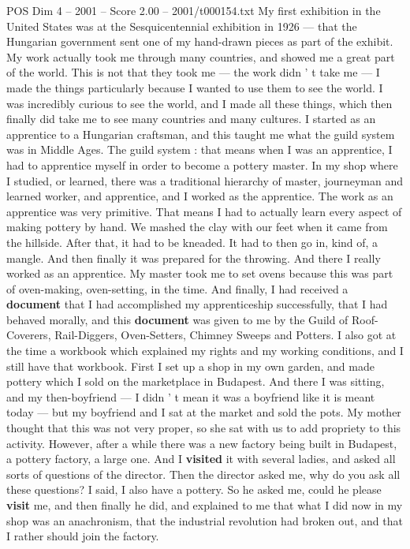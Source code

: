 \begin{textsample}{POS Dim 4 – 2001 – Score 2.00 – 2001/t000154.txt}
My first exhibition in the United States was at the Sesquicentennial exhibition in 1926 — that the Hungarian government sent one of my hand-drawn pieces as part of the exhibit.
My work actually took me through many countries, and showed me a great part of the world.
This is not that they took me — the work didn ' t take me — I made the things particularly because I wanted to use them to see the world.
I was incredibly curious to see the world, and I made all these things, which then finally did take me to see many countries and many cultures.
I started as an apprentice to a Hungarian craftsman, and this taught me what the guild system was in Middle Ages.
The guild system : that means when I was an apprentice, I had to apprentice myself in order to become a pottery master.
In my shop where I studied, or learned, there was a traditional hierarchy of master, journeyman and learned worker, and apprentice, and I worked as the apprentice.
The work as an apprentice was very primitive.
That means I had to actually learn every aspect of making pottery by hand.
We mashed the clay with our feet when it came from the hillside.
After that, it had to be kneaded.
It had to then go in, kind of, a mangle.
And then finally it was prepared for the throwing.
And there I really worked as an apprentice.
My master took me to set ovens because this was part of oven-making, oven-setting, in the time.
And finally, I had received a \textbf{document} that I had accomplished my apprenticeship successfully, that I had behaved morally, and this \textbf{document} was given to me by the Guild of Roof- Coverers, Rail-Diggers, Oven-Setters, Chimney Sweeps and Potters.
I also got at the time a workbook which explained my rights and my working conditions, and I still have that workbook.
First I set up a shop in my own garden, and made pottery which I sold on the marketplace in Budapest.
And there I was sitting, and my then-boyfriend — I didn ' t mean it was a boyfriend like it is meant today — but my boyfriend and I sat at the market and sold the pots.
My mother thought that this was not very proper, so she sat with us to add propriety to this activity.
However, after a while there was a new factory being built in Budapest, a pottery factory, a large one.
And I \textbf{visited} it with several ladies, and asked all sorts of questions of the director.
Then the director asked me, why do you ask all these questions?
I said, I also have a pottery.
So he asked me, could he please \textbf{visit} me, and then finally he did, and explained to me that what I did now in my shop was an anachronism, that the industrial revolution had broken out, and that I rather should join the factory.

\end{textsample}
